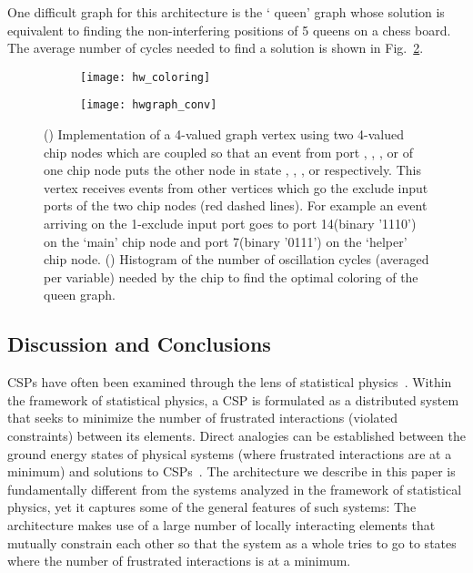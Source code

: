 \documentclass[10pt]{article}
\begin{document}
One difficult graph for this architecture is the ` queen' graph whose solution is equivalent to finding the non-interfering positions of 5 queens on a  chess board. The average number of cycles needed to find a solution is shown in Fig.~\ref{fig:hwcoloring_b}. 


\begin{figure}[h]
 \centering
 \begin{subfigure}[b]{0.4\textwidth}
     \texttt{[image: hw\_coloring]} 
     \subcaption{}
     \label{fig:hwcoloring_a}
   \end{subfigure}
   \quad
   \begin{subfigure}[b]{0.4\textwidth}
     \texttt{[image: hwgraph\_conv]} 
     \subcaption{}
     \label{fig:hwcoloring_b}
   \end{subfigure}


   \caption{() Implementation of a 4-valued graph vertex using two 4-valued chip nodes which are coupled so that an event from port , , , or  of one chip node puts the other node in state , , , or  respectively. This vertex receives events from other vertices which go the exclude input ports of the two chip nodes (red dashed lines). For example an event arriving on the 1-exclude input port goes to port 14(binary '1110') on the `main' chip node and port 7(binary '0111') on the `helper' chip node. () Histogram of the number of oscillation cycles (averaged per variable) needed by the chip to find the optimal coloring of the  queen graph.}
\label{fig:hwcoloring}
\end{figure}	


\subsection*{Discussion and Conclusions}
\label{sec:discussion}

CSPs have often been examined through the lens of statistical physics~\cite{mezard_etal02,krzakala_kurchan07}. Within the framework of statistical physics, a CSP is formulated as a distributed system that seeks to minimize the number of frustrated interactions (violated constraints) between its elements. Direct analogies can be established between the ground energy states of physical systems (where frustrated interactions are at a minimum) and solutions to CSPs~\cite{Barahona82}. The architecture we describe in this paper is fundamentally different from the systems analyzed in the framework of statistical physics, yet it captures some of the general features of such systems: The architecture makes use of a large number of locally interacting elements that mutually constrain each other so that the system as a whole tries to go to states where the number of frustrated interactions is at a minimum. 
\end{document}
